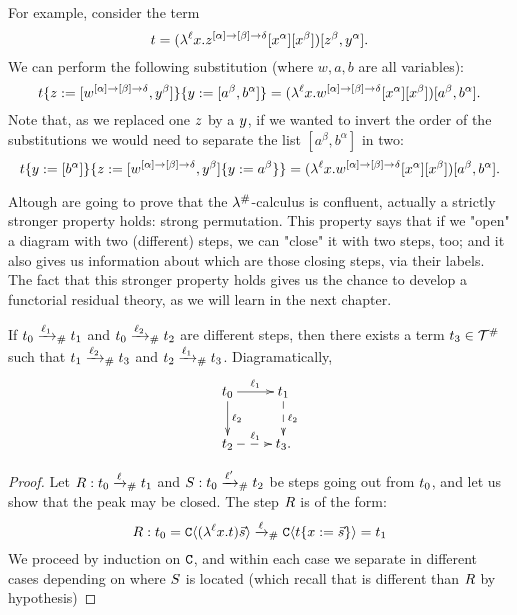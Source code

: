 \begin{example} For example, consider the term
\[
  t =
    (\lambda^{\ell} x. z^{[\alpha] \to [\beta] \to \delta} [x^\alpha] [x^\beta])
      [z^\beta,y^\alpha].
\]
We can perform the following substitution (where $w,a,b$ are all variables):
\[
  \subs{
    \subs{\tm}{\varthree}{[w^{[\alpha] \to [\beta] \to \delta}, \vartwo^\beta]}
  }{
    \vartwo
  }{
    [a^\beta,b^\alpha]
  }
  =
   (\lamp{\lab}{\var}{w^{[\alpha] \to [\beta] \to \delta} [\var^\alpha] [\var^\beta]})
    [a^\beta,b^\alpha].
\]
Note that, as we replaced one $z$ by a $y$, if we wanted to invert the order
of the substitutions we would need to separate the list $[a^\beta, b^\alpha]$ in two:
\[
  \subs{
    \subs{\tm}{\vartwo}{[b^\alpha]}
  }{
    \varthree
  }{
    \subs{[w^{[\alpha] \to [\beta] \to \delta}, \vartwo^\beta]}{\vartwo}{a^\beta}
  }
  =
   (\lamp{\lab}{\var}{w^{[\alpha] \to [\beta] \to \delta} [\var^\alpha] [\var^\beta]})
    [a^\beta,b^\alpha].
\]
\end{example}

\bigskip

Altough are going to prove that the $\lambda^{\mathtt{\#}}$-calculus is confluent,
actually a strictly stronger property holds: strong permutation.
This property says that if we "open" a diagram with two (different) steps,
we can "close" it with two steps, too; and it also gives us information
about which are those closing steps, via their labels.
The fact that this stronger property holds gives us the chance to
develop a functorial residual theory, as we will learn in the next chapter.



\begin{proposition}
If $t_0 \mathrel{\xrightarrow{\ell_1}_{\mathtt{\#}}} t_1$
and $t_0 \mathrel{\xrightarrow{\ell_2}_{\mathtt{\#}}} t_2$
are different steps, then there exists a term $t_3 \in \mathcal{T}^{\mathtt{\#}}$ such that
$t_1 \mathrel{\xrightarrow{\ell_2}_{\mathtt{\#}}} t_3$ and $t_2 \mathrel{\xrightarrow{\ell_1}_{\mathtt{\#}}} t_3$.
Diagramatically,
\[
    \xymatrix{
      \tm_0 \ar@{->}[d]^{\lab_2}
            \ar@{->}[r]^{\lab_1} &
      \tm_1 \ar@{-->}[d]^{\lab_2} \\
            \ar@{-->}[r]^{\lab_1}
      \tm_2 &
      \tm_3. \\
    }
\]
\end{proposition}
\begin{proof}
Let $R : t_0 \mathrel{\xrightarrow{\ell}_{\mathtt{\#}}} t_1$ and $S : t_0 \mathrel{\xrightarrow{\ell'}_{\mathtt{\#}}} t_2$
be steps going out from $t_0$, and let us show that the peak may be closed.
The step $R$ is of the form:
\[
  R : t_0 = \mathtt{C}\langle(\lambda^{\ell} x. t)\vec{s}\rangle
           \mathrel{\xrightarrow{\ell}_{\mathtt{\#}}} \mathtt{C}\langle t\{x := \vec{s}\}\rangle = t_1
\]
We proceed by induction on $\mathtt{C}$, and within each case we separate in different
cases depending on where $S$ is located (which recall that is different
than $R$ by hypothesis)
\end{proof}

